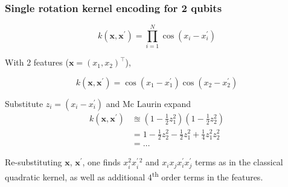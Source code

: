 \documentclass{beamer}
\begin{document}
    \begin{frame}[noframenumbering]
        \frametitle{Single rotation kernel encoding for 2 qubits}
    
        \small
        \begin{equation*}
            k\left( \mathbf{x}, \mathbf{x}^\prime \right) = \prod_{i=1}^{N}\cos\left( x_i - x_i^\prime \right) 
        \end{equation*}

        With 2 features ($\mathbf{x}=\left( x_1, x_2 \right)^\top$),

        \begin{equation*}
            k\left( \mathbf{x}, \mathbf{x}^\prime \right) = \cos\left( x_1 - x_1^\prime \right) \cos\left( x_2 - x_2^\prime \right)
        \end{equation*}

        Substitute $z_i = \left( x_i - x_i^\prime \right)$ and Mc Laurin expand
        \begin{align*}
            k\left( \mathbf{x}, \mathbf{x}^\prime \right) & \approxeq \left( 1 - \frac{1}{2} z_1^2 \right)\left( 1 - \frac{1}{2} z_2^2 \right)\\
            & = 1 - \frac{1}{2}z_2^2 - \frac{1}{2} z_1^2 + \frac{1}{4} z_1^2 z_2^2\\
            & = \dots
        \end{align*}

        Re-substituting $\mathbf{x}$, $\mathbf{x}^\prime$, one finds $x_i^2x_i^{\prime\, 2}$ and $x_i x_j x_i^\prime x_j^\prime$ terms as in the classical quadratic kernel, as well as additional 4\textsuperscript{th} order terms in the features.
    \end{frame}
        
        
\end{document}

